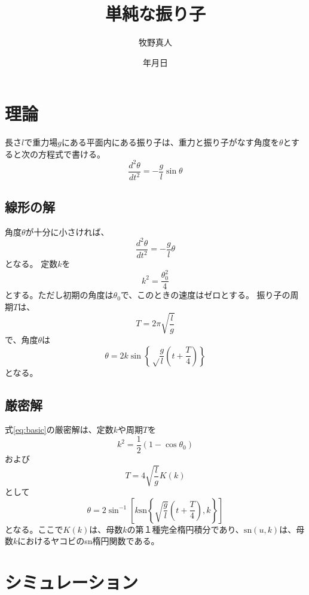 \documentclass[a4paper,11pt]{jarticle}
\title{単純な振り子}
\author{牧野真人}
\date{\number\year 年\number\month 月\number\day 日}
\begin{document}
\maketitle
\section{理論}
長さ$l$で重力場$g$にある平面内にある振り子は、重力と振り子がなす角度を$\theta$とすると次の方程式で書ける。
\begin{equation}
\frac{d^2\theta}{dt^2}=-\frac{g}{l}\sin\theta
\label{eq:basic}
\end{equation}
\subsection{線形の解}
角度$\theta$が十分に小さければ、
\begin{equation}
\frac{d^2\theta}{dt^2}=-\frac{g}{l}\theta
\end{equation}
となる。
定数$k$を
\begin{equation}
k^2=\frac{\theta_0^2}{4}
\end{equation}
とする。ただし初期の角度は$\theta_0$で、このときの速度はゼロとする。
振り子の周期$T$は、
\begin{equation}
T=2\pi\sqrt{\frac{l}{g}}
\end{equation}
で、角度$\theta$は
\begin{equation}
\theta=2k\sin\left\{\sqrt\frac{g}{l}\left(t+\frac{T}{4}\right)\right\}
\end{equation}
となる。
\subsection{厳密解}
式\eqref{eq:basic}の厳密解は、定数$k$や周期$T$を
\begin{equation}
k^2=\frac12\left(1-\cos\theta_0\right)
\end{equation}
および
\begin{equation}
T=4\sqrt{\frac{l}{g}}K(k)
\end{equation}
として
\begin{equation}
\theta=2\sin^{-1}\left[k \mbox{sn}\left\{\sqrt{\frac{g}{l}}\left(t+\frac{T}{4}\right),k\right\}\right]
\end{equation}
となる。ここで$K(k)$は、母数$k$の第１種完全楕円積分であり、$\mbox{sn}(u,k)$は、母数$k$におけるヤコビのsn楕円関数である。
\section{シミュレーション}
\end{document}
